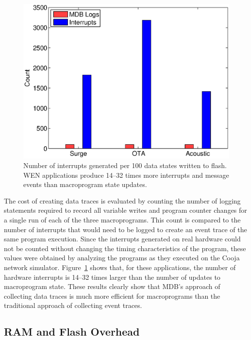 \begin{figure}[t]
  \centering
  \includegraphics[width=0.6\columnwidth]{fig/interruptvsMLLogger}
  \caption[Number of interrupts generated per 100 data states written to
  flash]{Number of interrupts generated per 100 data states written to
  flash. WEN applications produce 14--32 times more interrupts and message
  events than macroprogram state updates.}
  \label{fig:interruptvsMLLogger}
\end{figure}

The cost of creating data traces is evaluated by counting the number of logging
statements required to record all variable writes and program counter changes
for a single run of each of the three macroprograms. This count is compared to
the number of interrupts that would need to be logged to create an event trace
of the same program execution.  Since the interrupts generated on real hardware
could not be counted without changing the timing characteristics of the program,
these values were obtained by analyzing the programs as they executed on the
Cooja network simulator.  Figure~\ref{fig:interruptvsMLLogger} shows that, for
these applications, the number of hardware interrupts is 14--32 times larger
than the number of updates to macroprogram state.  These results clearly show
that MDB's approach of collecting data traces is much more efficient for
macroprograms than the traditional approach of collecting event traces.

\subsection{RAM and Flash Overhead} \label{overhead}

